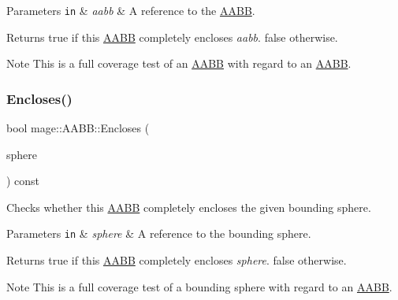 \begin{DoxyParams}[1]{Parameters}
\mbox{\tt in}  & {\em aabb} & A reference to the \hyperlink{classmage_1_1_a_a_b_b}{A\+A\+BB}. \\
\hline
\end{DoxyParams}
\begin{DoxyReturn}{Returns}
{\ttfamily true} if this \hyperlink{classmage_1_1_a_a_b_b}{A\+A\+BB} completely encloses {\itshape aabb}. {\ttfamily false} otherwise. 
\end{DoxyReturn}
\begin{DoxyNote}{Note}
This is a full coverage test of an \hyperlink{classmage_1_1_a_a_b_b}{A\+A\+BB} with regard to an \hyperlink{classmage_1_1_a_a_b_b}{A\+A\+BB}. 
\end{DoxyNote}
\hypertarget{classmage_1_1_a_a_b_b_ac8c2cadc06a6ad102c322504a43ca443}{}\label{classmage_1_1_a_a_b_b_ac8c2cadc06a6ad102c322504a43ca443} 
\subsubsection{\texorpdfstring{Encloses()}{Encloses()}\hspace{0.1cm}{\footnotesize\ttfamily [4/4]}}
{\footnotesize\ttfamily bool mage\+::\+A\+A\+B\+B\+::\+Encloses (\begin{DoxyParamCaption}\item[{const \hyperlink{classmage_1_1_bounding_sphere}{Bounding\+Sphere} \&}]{sphere }\end{DoxyParamCaption}) const\hspace{0.3cm}{\ttfamily [noexcept]}}

Checks whether this \hyperlink{classmage_1_1_a_a_b_b}{A\+A\+BB} completely encloses the given bounding sphere.


\begin{DoxyParams}[1]{Parameters}
\mbox{\tt in}  & {\em sphere} & A reference to the bounding sphere. \\
\hline
\end{DoxyParams}
\begin{DoxyReturn}{Returns}
{\ttfamily true} if this \hyperlink{classmage_1_1_a_a_b_b}{A\+A\+BB} completely encloses {\itshape sphere}. {\ttfamily false} otherwise. 
\end{DoxyReturn}
\begin{DoxyNote}{Note}
This is a full coverage test of a bounding sphere with regard to an \hyperlink{classmage_1_1_a_a_b_b}{A\+A\+BB}. 
\end{DoxyNote}
\hypertarget{classmage_1_1_a_a_b_b_a0399860c66da2dfc593b6ad5702c7525}{}\label{classmage_1_1_a_a_b_b_a0399860c66da2dfc593b6ad5702c7525} 
